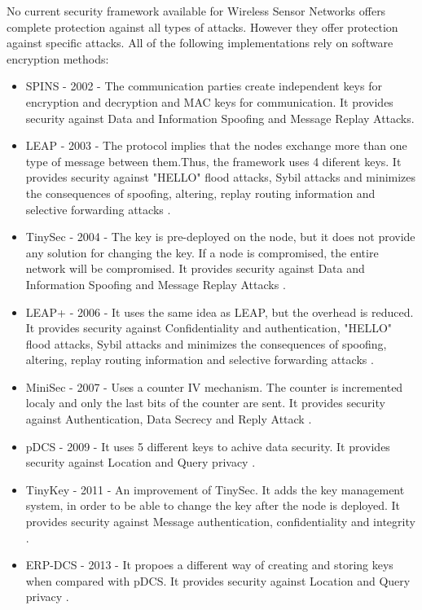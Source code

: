 No current security framework available for Wireless Sensor Networks offers complete protection
against all types of attacks. However they offer protection against specific attacks. All of the following implementations rely on 
software encryption methods:
\begin{itemize}

\item SPINS - 2002 - The communication parties create independent keys for encryption and decryption
and MAC keys for communication. It provides security against Data and Information Spoofing and Message Replay Attacks\cite{perrig2002spins}.

\item LEAP - 2003 - The protocol implies that the nodes exchange more than one type of message between them.Thus, the framework uses 4 diferent keys. It provides security against "HELLO" flood attacks, Sybil attacks and minimizes the consequences of spoofing, altering, replay routing information and selective forwarding attacks \cite{zhu2006leap+}.

\item TinySec - 2004 - The key is pre-deployed on the node, but it does not provide any solution for changing the key. If a node is compromised, the entire network will be compromised. It provides security against Data and Information Spoofing and Message Replay Attacks \cite{karlof2004tinysec}.

\item LEAP+ - 2006 - It uses the same idea as LEAP, but the overhead is reduced. It provides security against Confidentiality and authentication, "HELLO" flood attacks, Sybil attacks and minimizes the consequences of spoofing, altering, replay routing information and selective forwarding attacks \cite{zhu2006leap+}.
 
\item MiniSec - 2007 - Uses a counter IV mechanism. The counter is incremented localy and only the last bits of the counter are sent. It provides security against Authentication, Data Secrecy and Reply Attack \cite{luk2007minisec}.

\item pDCS - 2009 - It uses 5 different keys to achive data security. It provides security against Location and Query privacy \cite{shao2009pdcs}.

\item TinyKey - 2011 - An improvement of TinySec. It adds the key management system, in order to be able to change the key after the node is deployed. It provides security against Message authentication, confidentiality and integrity \cite{doriguzzi2011tinykey}.

\item ERP-DCS - 2013 - It propoes a different way of creating and storing keys when compared with pDCS. It provides security against Location and Query privacy \cite{huang2013efficient}.

\end{itemize}
